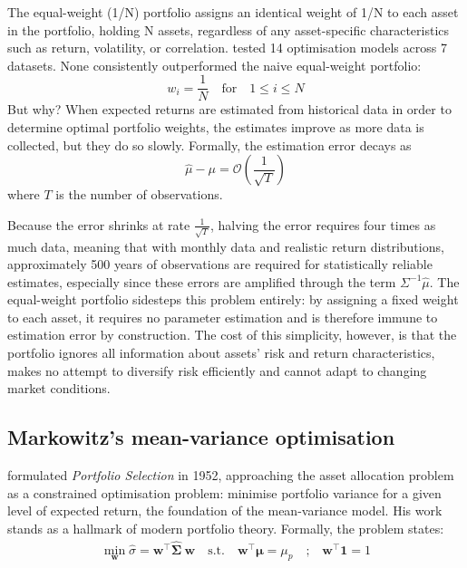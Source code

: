 \documentclass[a4paper,alpha-refs]{scr-contemporary}
\numberwithin{equation}{section}
\begin{document}
\indent \indent The equal-weight (1/N) portfolio assigns an identical weight of 1/N to each asset in the portfolio, holding N assets, regardless of any asset-specific 
characteristics such as return, volatility, or correlation. 
\citet{demiguel_optimal_2009} tested 14 optimisation models across 7 datasets. None consistently outperformed the naive equal-weight portfolio: 
\begin{equation}
  w_i = \frac{1}{N} \quad \text{for} \quad 1 \leq i \leq N
\end{equation}
\indent But why? When expected returns are estimated from historical data in order to determine optimal portfolio weights, the estimates 
improve as more data is collected, but they do so slowly. \newline
Formally, the estimation error decays as
\begin{equation}
  \hat{\mu} - \mu = \mathcal{O}\!\left(\frac{1}{\sqrt{T}}\right)
\end{equation}
where $T$ is the number of observations.

Because the error shrinks at rate $\frac{1}{\sqrt{T}}$, halving the 
error requires four times as much data, meaning that with monthly data 
and realistic return distributions, approximately 500 years of observations 
are required for statistically reliable estimates, especially since these
errors are amplified through the term $\Sigma^{-1}\hat{\mu}$. \newline
\indent The equal-weight portfolio sidesteps this problem entirely: by assigning a fixed weight to each asset, it requires no parameter estimation 
and is therefore immune to estimation error by construction. \newline
The cost of this simplicity, however, is that the portfolio ignores all information about assets' risk and return characteristics, makes 
no attempt to diversify risk efficiently and cannot adapt to changing market conditions.


\subsection{Markowitz's mean-variance optimisation}
\label{sec:mvo}

\indent \indent \citet{markowitz_portfolio_1952} formulated \textit{Portfolio Selection} in 1952, approaching the asset 
allocation problem as a constrained optimisation problem: minimise 
portfolio variance for a given level of expected return, the foundation of the mean-variance model.
His work stands as a hallmark of modern portfolio theory.\newline
\indent Formally, the problem states:
\begin{equation}                                         
  \begin{aligned}
  \min_{\mathbf{w}} \hat{\sigma} =
  \mathbf{w}^\top \hat{\boldsymbol{\Sigma}}\ \mathbf{w}
  \quad \text{s.t.} \quad
  \mathbf{w}^\top \boldsymbol{\mu} = \mu_p
  \quad \text{;} \quad 
  \mathbf{w}^\top\mathbf{1} = 1
  \end{aligned}
\end{equation}
\end{document}
